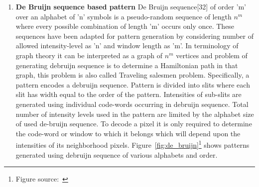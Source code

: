 \begin{enumerate}
\begin{enumerate}
\item \textbf{De Bruijn sequence based pattern}\newline
\noindent
De Bruijn sequence[32] of order 'm' over an alphabet of 'n' symbols is a pseudo-random sequence of length $n^m$ where every possible combination of length 'm' occurs only once. These sequences have been adapted for pattern generation by considering number of allowed intensity-level as 'n' and window length as 'm'. In terminology of graph theory it can be interpreted as a graph of $n^m$ vertices and problem of generating debruijn sequence is to determine a Hamiltonian path in that graph, this problem is also called Traveling salesmen problem. Specifically, a pattern encodes a debruijn sequence. Pattern is divided into slits where each slit has width equal to the order of the pattern. Intensities of sub-slits are generated using individual code-words occurring in debruijn sequence. Total number of intensity levels used in the pattern are limited by the alphabet size of used de-bruijn sequence. To decode a pixel it is only required to determine the code-word or window to which it belongs which will depend upon the intensities of its neighborhood pixels. Figure~\ref{fig:de_bruijn}\footnote{Figure source:~\cite{33}} shows patterns generated using debruijn sequence of various alphabets and order. 



\end{enumerate}
\end{enumerate}
